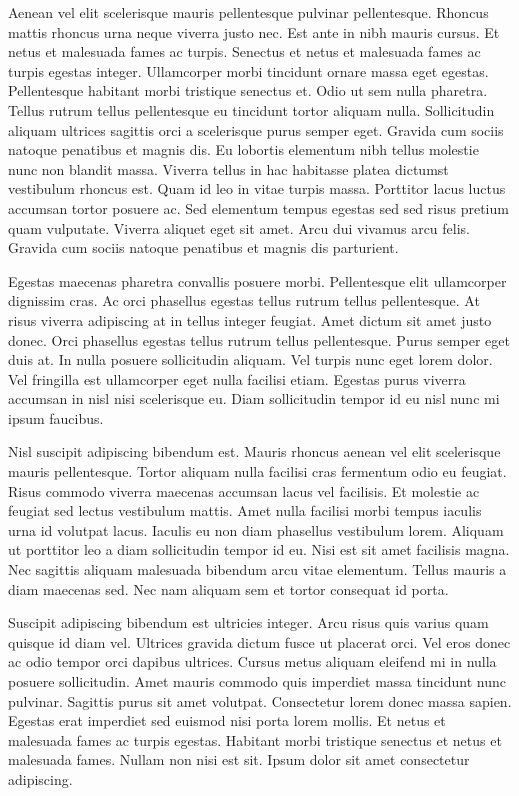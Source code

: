 \documentclass[11pt,a4paper]{article}
\begin{document}
Aenean vel elit scelerisque mauris pellentesque pulvinar pellentesque. Rhoncus mattis rhoncus urna neque viverra justo nec. Est ante in nibh mauris cursus. Et netus et malesuada fames ac turpis. Senectus et netus et malesuada fames ac turpis egestas integer. Ullamcorper morbi tincidunt ornare massa eget egestas. Pellentesque habitant morbi tristique senectus et. Odio ut sem nulla pharetra. Tellus rutrum tellus pellentesque eu tincidunt tortor aliquam nulla. Sollicitudin aliquam ultrices sagittis orci a scelerisque purus semper eget. Gravida cum sociis natoque penatibus et magnis dis. Eu lobortis elementum nibh tellus molestie nunc non blandit massa. Viverra tellus in hac habitasse platea dictumst vestibulum rhoncus est. Quam id leo in vitae turpis massa. Porttitor lacus luctus accumsan tortor posuere ac. Sed elementum tempus egestas sed sed risus pretium quam vulputate. Viverra aliquet eget sit amet. Arcu dui vivamus arcu felis. Gravida cum sociis natoque penatibus et magnis dis parturient.

Egestas maecenas pharetra convallis posuere morbi. Pellentesque elit ullamcorper dignissim cras. Ac orci phasellus egestas tellus rutrum tellus pellentesque. At risus viverra adipiscing at in tellus integer feugiat. Amet dictum sit amet justo donec. Orci phasellus egestas tellus rutrum tellus pellentesque. Purus semper eget duis at. In nulla posuere sollicitudin aliquam. Vel turpis nunc eget lorem dolor. Vel fringilla est ullamcorper eget nulla facilisi etiam. Egestas purus viverra accumsan in nisl nisi scelerisque eu. Diam sollicitudin tempor id eu nisl nunc mi ipsum faucibus.

Nisl suscipit adipiscing bibendum est. Mauris rhoncus aenean vel elit scelerisque mauris pellentesque. Tortor aliquam nulla facilisi cras fermentum odio eu feugiat. Risus commodo viverra maecenas accumsan lacus vel facilisis. Et molestie ac feugiat sed lectus vestibulum mattis. Amet nulla facilisi morbi tempus iaculis urna id volutpat lacus. Iaculis eu non diam phasellus vestibulum lorem. Aliquam ut porttitor leo a diam sollicitudin tempor id eu. Nisi est sit amet facilisis magna. Nec sagittis aliquam malesuada bibendum arcu vitae elementum. Tellus mauris a diam maecenas sed. Nec nam aliquam sem et tortor consequat id porta.

Suscipit adipiscing bibendum est ultricies integer. Arcu risus quis varius quam quisque id diam vel. Ultrices gravida dictum fusce ut placerat orci. Vel eros donec ac odio tempor orci dapibus ultrices. Cursus metus aliquam eleifend mi in nulla posuere sollicitudin. Amet mauris commodo quis imperdiet massa tincidunt nunc pulvinar. Sagittis purus sit amet volutpat. Consectetur lorem donec massa sapien. Egestas erat imperdiet sed euismod nisi porta lorem mollis. Et netus et malesuada fames ac turpis egestas. Habitant morbi tristique senectus et netus et malesuada fames. Nullam non nisi est sit. Ipsum dolor sit amet consectetur adipiscing.
\end{document}
